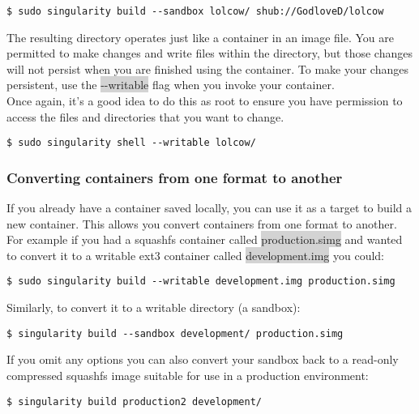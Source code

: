 \documentclass[a4paper]{article}
\begin{document}
\begin{lstlisting}[frame=single]  
$ sudo singularity build --sandbox lolcow/ shub://GodloveD/lolcow
\end{lstlisting}	
	
The resulting directory operates just like a container in an image file. You are permitted to make changes and write files within the directory, but those changes will not persist when you are finished using the container. To make your changes persistent, use the \colorbox{lightgray}{-{}-writable} flag when you invoke your container.
\\[0.1in]
Once again, it’s a good idea to do this as root to ensure you have permission to access the files and directories that you want to change.

\begin{lstlisting}[frame=single] 
$ sudo singularity shell --writable lolcow/
\end{lstlisting}
	
\subsubsection{Converting containers from one format to another}

If you already have a container saved locally, you can use it as a target to build a new container. This allows you convert containers from one format to another. For example if you had a squashfs container called \colorbox{lightgray}{production.simg} and wanted to convert it to a writable ext3 container called \colorbox{lightgray}{development.img} you could:


\begin{lstlisting}[frame=single] 
$ sudo singularity build --writable development.img production.simg
\end{lstlisting}

	Similarly, to convert it to a writable directory (a sandbox):\\[0.1in]
	
	
\begin{lstlisting}[frame=single] 
$ singularity build --sandbox development/ production.simg
\end{lstlisting}

If you omit any options you can also convert your sandbox back to a read-only compressed squashfs image suitable for use in a production environment:

\begin{lstlisting}[frame=single] 
$ singularity build production2 development/
\end{lstlisting}
\end{document}
